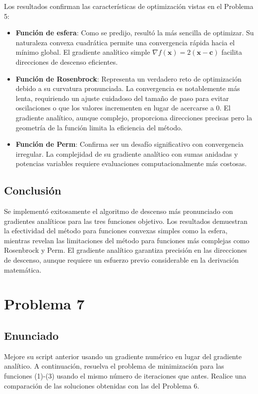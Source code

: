 \documentclass{article}
\begin{document}
Los resultados confirman las características de optimización vistas en el Problema 5:

\begin{itemize}
    \item \textbf{Función de esfera}: Como se predijo, resultó la más sencilla de optimizar. Su naturaleza convexa cuadrática permite una convergencia rápida hacia el mínimo global. El gradiente analítico simple $\nabla f(\mathbf{x}) = 2(\mathbf{x} - \mathbf{c})$ facilita direcciones de descenso eficientes.
    
    \item \textbf{Función de Rosenbrock}: Representa un verdadero reto de optimización debido a su curvatura pronunciada. La convergencia es notablemente más lenta, requiriendo un ajuste cuidadoso del tamaño de paso para evitar oscilaciones o que los valores incrementen en lugar de acercarse a 0. El gradiente analítico, aunque complejo, proporciona direcciones precisas pero la geometría de la función limita la eficiencia del método.
    
    \item \textbf{Función de Perm}: Confirma ser un desafío significativo con convergencia irregular. La complejidad de su gradiente analítico con sumas anidadas y potencias variables requiere evaluaciones computacionalmente más costosas.
\end{itemize}

\subsection{Conclusión}

Se implementó exitosamente el algoritmo de descenso más pronunciado con gradientes analíticos para las tres funciones objetivo. Los resultados demuestran la efectividad del método para funciones convexas simples como la esfera, mientras revelan las limitaciones del método para funciones más complejas como Rosenbrock y Perm. El gradiente analítico garantiza precisión en las direcciones de descenso, aunque requiere un esfuerzo previo considerable en la derivación matemática.

\section{Problema 7}

\subsection{Enunciado}
Mejore su script anterior usando un gradiente numérico en lugar del gradiente analítico. A continuación, resuelva el problema de minimización para las funciones (1)-(3) usando el mismo número de iteraciones que antes. Realice una comparación de las soluciones obtenidas con las del Problema 6.
\end{document}
